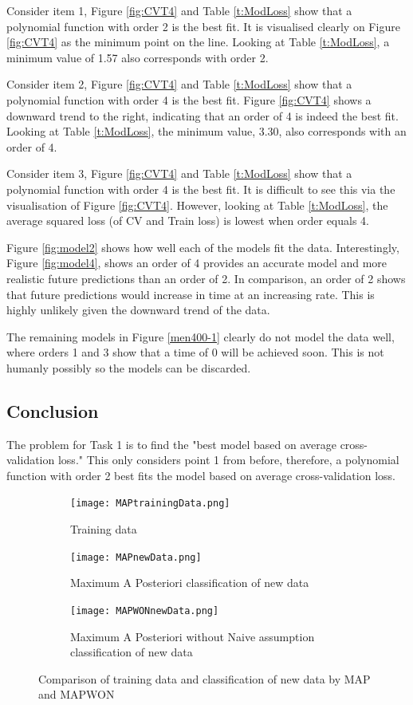 {{	Consider item 1, Figure \ref{fig:CVT4} and Table \ref{t:ModLoss} show that a polynomial function with order 2 is the best fit. It is visualised clearly on Figure \ref{fig:CVT4} as the minimum point on the line. Looking at Table \ref{t:ModLoss}, a minimum value of 1.57 also corresponds with order 2.
	
	Consider item 2, Figure \ref{fig:CVT4} and Table \ref{t:ModLoss} show that a polynomial function with order 4 is the best fit. Figure \ref{fig:CVT4} shows a downward trend to the right, indicating that an order of 4 is indeed the best fit. Looking at Table \ref{t:ModLoss}, the minimum value, 3.30, also corresponds with an order of 4.
	
	Consider item 3, Figure \ref{fig:CVT4} and Table \ref{t:ModLoss} show that a polynomial function with order 4 is the best fit. It is difficult to see this via the visualisation of Figure \ref{fig:CVT4}. However, looking at Table \ref{t:ModLoss}, the average squared loss (of CV and Train loss) is lowest when order equals 4. 
	
	Figure \ref{fig:model2} shows how well each of the models fit the data. Interestingly, Figure \ref{fig:model4}, shows an order of 4 provides an accurate model and more realistic future predictions than an order of 2. In comparison, an order of 2 shows that future predictions would increase in time at an increasing rate. This is highly unlikely given the downward trend of the data.
	
	The remaining models in Figure \ref{men400-1} clearly do not model the data well, where orders 1 and 3 show that a time of 0 will be achieved soon. This is not humanly possibly so the models can be discarded. 
	
	\subsection{Conclusion}
	The problem for Task 1 is to find the "best model based on average cross-validation loss." This only considers point 1 from before, therefore, a polynomial function with order 2 best fits the model based on average cross-validation loss.
	
	\begin{figure}[h!] 
		\centering
		\begin{subfigure}[b]{.49\textwidth}
			\texttt{[image: MAPtrainingData.png]}
			\caption{Training data}
			\label{fig:modelNoReg0}
		\end{subfigure}
		\begin{subfigure}[b]{.49\textwidth}
			\texttt{[image: MAPnewData.png]}
			\caption{Maximum A Posteriori classification of new data}
			\label{fig:modelNoReg1}
		\end{subfigure}
		\begin{subfigure}[b]{.49\textwidth}
			\texttt{[image: MAPWONnewData.png]}
			\caption{Maximum A Posteriori without Naive assumption classification of new data}
			\label{fig:modelNoReg1}
		\end{subfigure}
		\caption{Comparison of training data and classification of new data by MAP and MAPWON}
		\label{fig:CMAP}
	\end{figure}
	
}}
